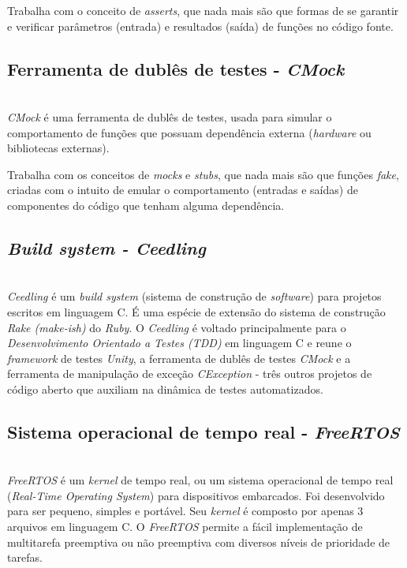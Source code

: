 \documentclass[times, twoside, watermark]{artigo}
\begin{document}
Trabalha com o conceito de \textit{asserts}, que nada mais são que formas de se 
garantir e verificar parâmetros (entrada) e resultados (saída) de funções no código 
fonte.\cite{unity}


\subsection{Ferramenta de dublês de testes - \textit{CMock}}\hfill\\

\textit{CMock} é uma ferramenta de dublês de testes, usada para simular o 
comportamento de funções que possuam dependência externa (\textit{hardware} ou 
bibliotecas externas).

Trabalha com os conceitos de \textit{mocks} e \textit{stubs}, 
que nada mais são que funções \textit{fake}, criadas com o intuito de emular o 
comportamento (entradas e saídas) de componentes do código que tenham alguma 
dependência.\cite{cmock}

\subsection{\textit{Build system - Ceedling}}\hfill\\

\textit{Ceedling} é um \textit{build system} (sistema de construção de 
\textit{software}) para projetos escritos em linguagem C.
É uma espécie de extensão do sistema de construção \textit{Rake (make-ish)} do 
\textit{Ruby}.
O \textit{Ceedling} é voltado principalmente para o 
\textit{Desenvolvimento Orientado a Testes (TDD)} em linguagem C e reune o 
\textit{framework} de testes \textit{Unity}, a ferramenta de dublês de testes 
\textit{CMock} e a ferramenta de manipulação de exceção \textit{CException} - três 
outros projetos de código aberto que auxiliam na dinâmica de testes 
automatizados\cite{gomes2016uttos}.

\subsection{Sistema operacional de tempo real - \textit{FreeRTOS}}\hfill\\

\textit{FreeRTOS} é um \textit{kernel} de tempo real, 
ou um sistema operacional de tempo real (\textit{Real-Time Operating System}) 
para dispositivos embarcados. Foi desenvolvido para ser pequeno, simples e portável. 
Seu \textit{kernel} é composto por apenas 3 arquivos em linguagem C. 
O \textit{FreeRTOS} permite a fácil implementação de multitarefa preemptiva 
ou não preemptiva com diversos níveis de prioridade de 
tarefas\cite{zhu2016understanding}.\hfill\\
\end{document}

